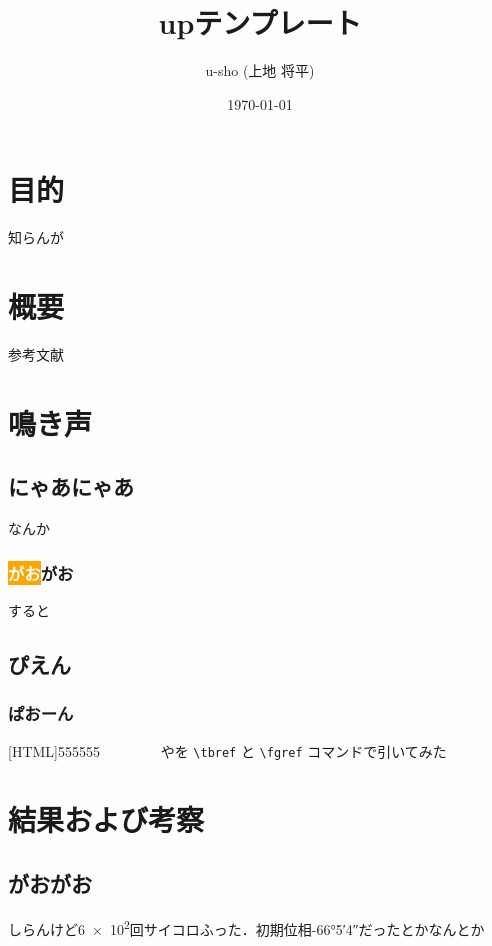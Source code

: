 \documentclass[uplatex,dvipdfmx]{ushoArticle}
\title{up\LaTeXe テンプレート} %
\author{u-sho (上地 将平)}
\date{\today}
\begin{document}
  \maketitle
  \tableofcontents

  \newpage

  \section{目的}%
    知らんが

  \section{概要}%
    参考文献~\cite{キー1}

  \section{鳴き声} %

    \subsection{にゃあにゃあ}
      なんか

    \subsubsection{\colorbox{orange}{\textcolor{white}{がお}}がお}
      すると

  \subsection{ぴえん} %

  \subsubsection{ぱおーん}
    [HTML]{555555}{\textcolor{white}{ぱおーん}}
    やを \verb|\tbref| と \verb|\fgref| コマンドで引いてみた

  \newpage

  \section{結果および考察}
    \subsection{がおがお}
      しらんけど\num{6e2}回サイコロふった．初期位相\ang{-66;5;4}だったとかなんとか
\end{document}
